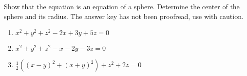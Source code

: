 Show that the equation is an equation of a sphere. Determine the center of the sphere and its radius. The answer key has not been proofread, use with caution.

\begin{enumerate}
\item 
$
x^2+y^2+z^2-2x+3y+5z=0
$
\item 
$
x^2+y^2+z^2-x-2y-3z=0
$

\item $\frac{1}{2}\left((x-y)^2 + (x+y)^2\right) +z^2+2z=0   $
\end{enumerate}